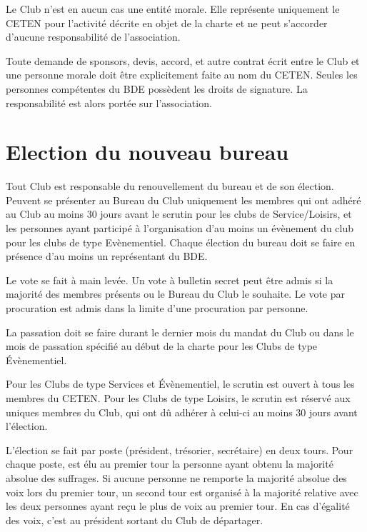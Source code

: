 \documentclass{article} %
\begin{document}
\begin{multicols}{2}
		{\small

			Le Club n’est en aucun cas une entité morale. Elle
			représente uniquement le CETEN pour l’activité décrite en
			objet de la charte et ne peut s’accorder d’aucune
			responsabilité de l’association.

			Toute demande de sponsors, devis, accord, et autre contrat
			écrit entre le Club et une personne morale doit être
			explicitement faite au nom du CETEN. Seules les personnes
			compétentes du BDE possèdent les droits de signature. La
			responsabilité est alors portée sur l’association.

		}

		\section{Election du nouveau bureau}

		{\small

			Tout Club est responsable du renouvellement du bureau et
			de son élection. Peuvent se présenter au Bureau du Club
			uniquement les membres qui ont adhéré au Club au moins
			30 jours avant le scrutin pour les clubs de Service/Loisirs, et
			les personnes ayant participé à l’organisation d’au moins un
			évènement du club pour les clubs de type Evènementiel.
			Chaque élection du bureau doit se faire en présence d’au
			moins un représentant du BDE.

			Le vote se fait à main levée. Un vote à bulletin secret peut
			être admis si la majorité des membres présents ou le Bureau
			du Club le souhaite. Le vote par procuration est admis dans
			la limite d’une procuration par personne.

			La passation doit se faire durant le dernier mois du mandat
			du Club ou dans le mois de passation spécifié au début de la
			charte pour les Clubs de type Évènementiel.

			Pour les Clubs de type Services et Évènementiel, le scrutin
			est ouvert à tous les membres du CETEN. Pour les Clubs de
			type Loisirs, le scrutin est réservé aux uniques membres du
			Club, qui ont dû adhérer à celui-ci au moins 30 jours avant
			l’élection.

			L’élection se fait par poste (président, trésorier, secrétaire)
			en deux tours. Pour chaque poste, est élu au premier tour la
			personne ayant obtenu la majorité absolue des suffrages. Si
			aucune personne ne remporte la majorité absolue des voix
			lors du premier tour, un second tour est organisé à la
			majorité relative avec les deux personnes ayant reçu le plus
			de voix au premier tour. En cas d’égalité des voix, c’est au
			président sortant du Club de départager.

}
\end{multicols}
\end{document}
